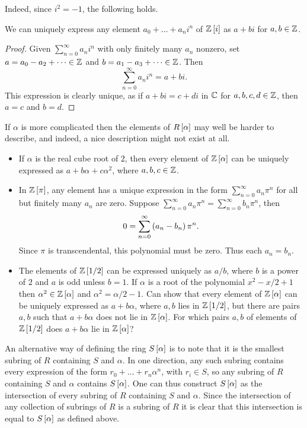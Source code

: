 Indeed, since $ i^2 = -1 $, the following holds.

\begin{proposition}
We can uniquely express any element $ a_0 + \dots + a_ni^n $ of $ \Z\sb{i} $ as $ a + bi $ for $ a, b \in \Z $.
\end{proposition}

\begin{proof}
Given $ \sum_{n = 0}^\infty a_ni^n $ with only finitely many $ a_n $ nonzero, set $ a = a_0 - a_2 + \dots \in \Z $ and $ b = a_1 - a_3 + \dots \in \Z $. Then
$$ \sum_{n = 0}^\infty a_ni^n = a + bi. $$
This expression is clearly unique, as if $ a + bi = c + di $ in $ \C $ for $ a, b, c, d \in \Z $, then $ a = c $ and $ b = d $.
\end{proof}

If $ \alpha $ is more complicated then the elements of $ R\sb{\alpha} $ may well be harder to describe, and indeed, a nice description might not exist at all.

\begin{example*}
\hfill
\begin{itemize}
\item If $ \alpha $ is the real cube root of $ 2 $, then every element of $ \Z\sb{\alpha} $ can be uniquely expressed as $ a + b\alpha + c\alpha^2 $, where $ a, b, c \in \Z $.
\item In $ \Z\sb{\pi} $, any element has a unique expression in the form $ \sum_{n = 0}^\infty a_n\pi^n $ for all but finitely many $ a_n $ are zero. Suppose $ \sum_{n = 0}^\infty a_n\pi^n = \sum_{n = 0}^\infty b_n\pi^n $, then
$$ 0 = \sum_{n = 0}^\infty \rb{a_n - b_n}\pi^n. $$
Since $ \pi $ is transcendental, this polynomial must be zero. Thus each $ a_n = b_n $.
\item The elements of $ \Z\sb{1 / 2} $ can be expressed uniquely as $ a / b $, where $ b $ is a power of $ 2 $ and $ a $ is odd unless $ b = 1 $. If $ \alpha $ is a root of the polynomial $ x^2 - x / 2 + 1 $ then $ \alpha^2 \in \Z\sb{\alpha} $ and $ \alpha^2 = \alpha / 2 - 1 $. Can show that every element of $ \Z\sb{\alpha} $ can be uniquely expressed as $ a + b\alpha $, where $ a, b $ lies in $ \Z\sb{1 / 2} $, but there are pairs $ a, b $ such that $ a + b\alpha $ does not lie in $ \Z\sb{\alpha} $. For which pairs $ a, b $ of elements of $ \Z\sb{1 / 2} $ does $ a + b\alpha $ lie in $ \Z\sb{\alpha} $?
\end{itemize}
\end{example*}

An alternative way of defining the ring $ S\sb{\alpha} $ is to note that it is the smallest subring of $ R $ containing $ S $ and $ \alpha $. In one direction, any such subring contains every expression of the form $ r_0 + \dots + r_n\alpha^n $, with $ r_i \in S $, so any subring of $ R $ containing $ S $ and $ \alpha $ contains $ S\sb{\alpha} $. One can thus construct $ S\sb{\alpha} $ as the intersection of every subring of $ R $ containing $ S $ and $ \alpha $. Since the intersection of any collection of subrings of $ R $ is a subring of $ R $ it is clear that this intersection is equal to $ S\sb{\alpha} $ as defined above.

